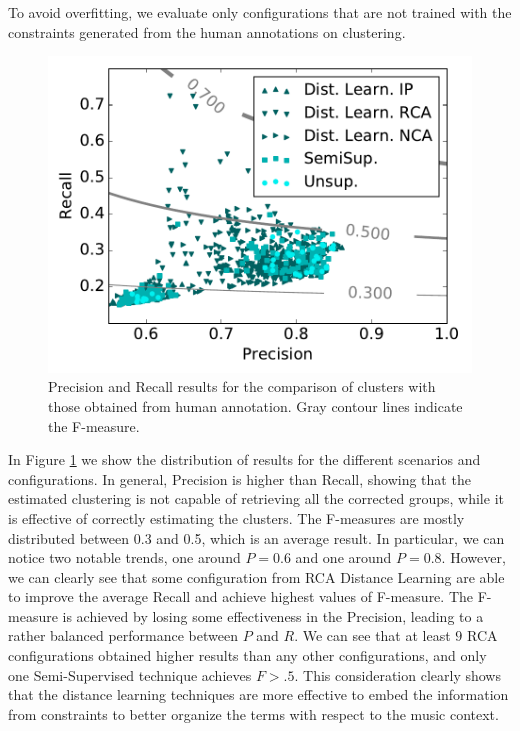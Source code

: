 To avoid overfitting, we evaluate only configurations that are not trained with the constraints generated from the human annotations on clustering.

\begin{figure}[tbp]
	\centering 
     \includegraphics[width=.75\columnwidth]{img/ANEW/F_measure_square.pdf}
	\caption{Precision and Recall results for the comparison of clusters with those obtained from human annotation. Gray contour lines indicate the F-measure.}
	\label{fig:ANEWF_measure}
\end{figure}	

In Figure \ref{fig:ANEWF_measure} we show the distribution of results for the different scenarios and configurations. In general, Precision is higher than Recall, showing that the estimated clustering is not capable of retrieving all the corrected groups, while it is effective of correctly estimating the clusters. The F-measures are mostly distributed between 0.3 and 0.5, which is an average result. In particular, we can notice two notable trends, one around $P=0.6$ and one around $P=0.8$.
However, we can clearly see that some configuration from RCA Distance Learning are able to improve the average Recall and achieve highest values of F-measure.  The F-measure is achieved by losing some effectiveness in the Precision, leading to a rather balanced performance between $P$ and $R$. We can see that at least $9$ RCA configurations obtained higher results than any other configurations, and only one Semi-Supervised technique achieves $F>.5$. This consideration clearly shows that the distance learning techniques are more effective to embed the information from constraints to better organize the terms with respect to the music context. 

